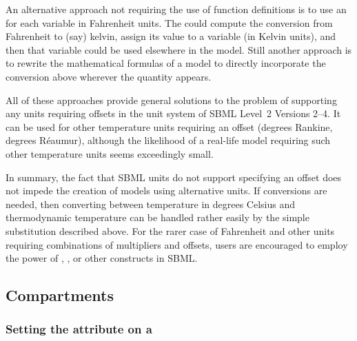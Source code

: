 \begin{itemize}
  An alternative approach not requiring the use of function
  definitions is to use an \AssignmentRule for each variable in
  Fahrenheit units.  The \AssignmentRule could compute the
  conversion from Fahrenheit to (say) kelvin, assign its value to
  a variable (in Kelvin units), and then that variable could be
  used elsewhere in the model.  Still another approach is to
  rewrite the mathematical formulas of a model to directly
  incorporate the conversion above wherever
  the quantity appears.

  All of these approaches provide general solutions to the problem
  of supporting any units requiring offsets in the unit system of
  SBML Level~2 Versions 2--4.  It can be used for other temperature units
  requiring an offset (\eg degrees Rankine, degrees R\'{e}aumur),
  although the likelihood of a real-life model requiring such
  other temperature units seems exceedingly small.

\end{itemize}

In summary, the fact that SBML units do not support specifying an offset 
does  not impede the creation of models using alternative units.  If
conversions are needed, then converting between temperature in
degrees Celsius and thermodynamic temperature can be handled
rather easily by the simple substitution described above.  For the
rarer case of Fahrenheit and other units requiring combinations of
multipliers and offsets, users are encouraged to employ the power
of \FunctionDefinition, \AssignmentRule, or other constructs in
SBML.



\subsection{Compartments}
\label{sec:bp:compartment}


\subsubsection{Setting the  attribute on a }
\label{sec:bp:size}

